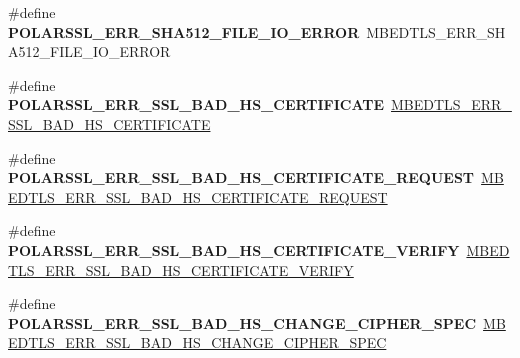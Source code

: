 \begin{DoxyCompactItemize}
\mbox{\label{compat-1_83_8h_a245abc0d05dcfa853d18d20a28d19ec2}} 
\#define {\bfseries P\+O\+L\+A\+R\+S\+S\+L\+\_\+\+E\+R\+R\+\_\+\+S\+H\+A512\+\_\+\+F\+I\+L\+E\+\_\+\+I\+O\+\_\+\+E\+R\+R\+OR}~M\+B\+E\+D\+T\+L\+S\+\_\+\+E\+R\+R\+\_\+\+S\+H\+A512\+\_\+\+F\+I\+L\+E\+\_\+\+I\+O\+\_\+\+E\+R\+R\+OR
\item 
\mbox{\label{compat-1_83_8h_abdc6f709e309ee39f6f1b085ee941a55}} 
\#define {\bfseries P\+O\+L\+A\+R\+S\+S\+L\+\_\+\+E\+R\+R\+\_\+\+S\+S\+L\+\_\+\+B\+A\+D\+\_\+\+H\+S\+\_\+\+C\+E\+R\+T\+I\+F\+I\+C\+A\+TE}~\mbox{\hyperlink{ssl_8h_a99d5367b23365159412220ffd9aad20f}{M\+B\+E\+D\+T\+L\+S\+\_\+\+E\+R\+R\+\_\+\+S\+S\+L\+\_\+\+B\+A\+D\+\_\+\+H\+S\+\_\+\+C\+E\+R\+T\+I\+F\+I\+C\+A\+TE}}
\item 
\mbox{\label{compat-1_83_8h_a295157be7847f73e569ac41fb81faa08}} 
\#define {\bfseries P\+O\+L\+A\+R\+S\+S\+L\+\_\+\+E\+R\+R\+\_\+\+S\+S\+L\+\_\+\+B\+A\+D\+\_\+\+H\+S\+\_\+\+C\+E\+R\+T\+I\+F\+I\+C\+A\+T\+E\+\_\+\+R\+E\+Q\+U\+E\+ST}~\mbox{\hyperlink{ssl_8h_a4864e3750b4f379143952215f0b1adc6}{M\+B\+E\+D\+T\+L\+S\+\_\+\+E\+R\+R\+\_\+\+S\+S\+L\+\_\+\+B\+A\+D\+\_\+\+H\+S\+\_\+\+C\+E\+R\+T\+I\+F\+I\+C\+A\+T\+E\+\_\+\+R\+E\+Q\+U\+E\+ST}}
\item 
\mbox{\label{compat-1_83_8h_a26bdac13261b618681a39b0a20ebf103}} 
\#define {\bfseries P\+O\+L\+A\+R\+S\+S\+L\+\_\+\+E\+R\+R\+\_\+\+S\+S\+L\+\_\+\+B\+A\+D\+\_\+\+H\+S\+\_\+\+C\+E\+R\+T\+I\+F\+I\+C\+A\+T\+E\+\_\+\+V\+E\+R\+I\+FY}~\mbox{\hyperlink{ssl_8h_aa420bf6b4652f53f178900f42f6e5b10}{M\+B\+E\+D\+T\+L\+S\+\_\+\+E\+R\+R\+\_\+\+S\+S\+L\+\_\+\+B\+A\+D\+\_\+\+H\+S\+\_\+\+C\+E\+R\+T\+I\+F\+I\+C\+A\+T\+E\+\_\+\+V\+E\+R\+I\+FY}}
\item 
\mbox{\label{compat-1_83_8h_a1b2917c9869b66d3d7c026b5b0e00652}} 
\#define {\bfseries P\+O\+L\+A\+R\+S\+S\+L\+\_\+\+E\+R\+R\+\_\+\+S\+S\+L\+\_\+\+B\+A\+D\+\_\+\+H\+S\+\_\+\+C\+H\+A\+N\+G\+E\+\_\+\+C\+I\+P\+H\+E\+R\+\_\+\+S\+P\+EC}~\mbox{\hyperlink{ssl_8h_ad314b558c98da450853468f71895d615}{M\+B\+E\+D\+T\+L\+S\+\_\+\+E\+R\+R\+\_\+\+S\+S\+L\+\_\+\+B\+A\+D\+\_\+\+H\+S\+\_\+\+C\+H\+A\+N\+G\+E\+\_\+\+C\+I\+P\+H\+E\+R\+\_\+\+S\+P\+EC}}
\item 
\mbox{\label{compat-1_83_8h_a981518b3ec1d68d785028766ccd735ae}} 

\end{DoxyCompactItemize}
